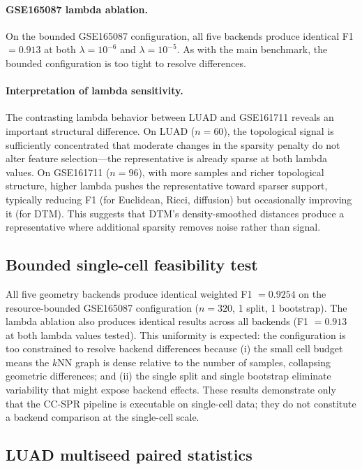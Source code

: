 \documentclass[11pt]{article}
\begin{document}
\paragraph{GSE165087 lambda ablation.}
On the bounded GSE165087 configuration, all five backends produce identical F1 $= 0.913$ at both $\lambda = 10^{-6}$ and $\lambda = 10^{-5}$.
As with the main benchmark, the bounded configuration is too tight to resolve differences.

\paragraph{Interpretation of lambda sensitivity.}
The contrasting lambda behavior between LUAD and GSE161711 reveals an important structural difference.
On LUAD ($n = 60$), the topological signal is sufficiently concentrated that moderate changes in the sparsity penalty do not alter feature selection---the representative is already sparse at both lambda values.
On GSE161711 ($n = 96$), with more samples and richer topological structure, higher lambda pushes the representative toward sparser support, typically reducing F1 (for Euclidean, Ricci, diffusion) but occasionally improving it (for DTM).
This suggests that DTM's density-smoothed distances produce a representative where additional sparsity removes noise rather than signal.

\subsection{Bounded single-cell feasibility test}

All five geometry backends produce identical weighted F1 $= 0.9254$ on the resource-bounded GSE165087 configuration ($n = 320$, 1 split, 1 bootstrap).
The lambda ablation also produces identical results across all backends (F1 $= 0.913$ at both lambda values tested).
This uniformity is expected: the configuration is too constrained to resolve backend differences because (i) the small cell budget means the $k$NN graph is dense relative to the number of samples, collapsing geometric differences; and (ii) the single split and single bootstrap eliminate variability that might expose backend effects.
These results demonstrate only that the CC-SPR pipeline is executable on single-cell data; they do not constitute a backend comparison at the single-cell scale.

\subsection{LUAD multiseed paired statistics}
\end{document}
